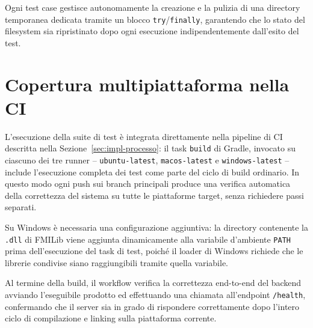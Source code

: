 Ogni test case gestisce autonomamente la creazione e la pulizia di una directory temporanea dedicata tramite un blocco \texttt{try}/\texttt{finally}, garantendo che lo stato del filesystem sia ripristinato dopo ogni esecuzione indipendentemente dall'esito del test.

\section{Copertura multipiattaforma nella CI}
\label{sec:val-ci}

L'esecuzione della suite di test è integrata direttamente nella pipeline di CI descritta nella Sezione~\ref{sec:impl-processo}: il task \texttt{build} di Gradle, invocato su ciascuno dei tre runner -- \texttt{ubuntu-latest}, \texttt{macos-latest} e \texttt{windows-latest} -- include l'esecuzione completa dei test come parte del ciclo di build ordinario. In questo modo ogni push sui branch principali produce una verifica automatica della correttezza del sistema su tutte le piattaforme target, senza richiedere passi separati.

Su Windows è necessaria una configurazione aggiuntiva: la directory contenente la \texttt{.dll} di FMILib viene aggiunta dinamicamente alla variabile d'ambiente \texttt{PATH} prima dell'esecuzione del task di test, poiché il loader di Windows richiede che le librerie condivise siano raggiungibili tramite quella variabile.

Al termine della build, il workflow verifica la correttezza end-to-end del backend avviando l'eseguibile prodotto ed effettuando una chiamata all'endpoint \texttt{/health}, confermando che il server sia in grado di rispondere correttamente dopo l'intero ciclo di compilazione e linking sulla piattaforma corrente.